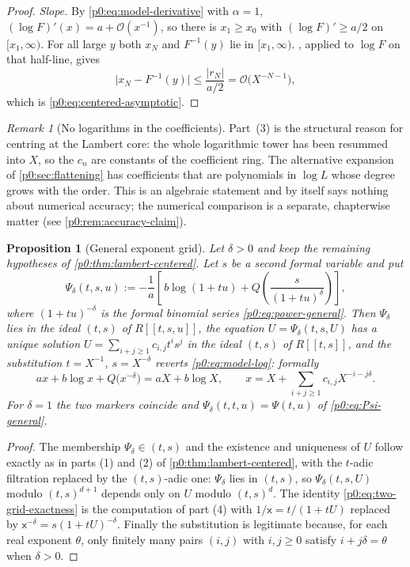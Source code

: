 \documentclass[11pt,a4paper,oneside]{book}
\theoremstyle{plain}
\newtheorem{proposition}[theorem]{Proposition}
\theoremstyle{definition}
\theoremstyle{remark}
\newtheorem{remark}[theorem]{Remark}
\newcommand{\bigO}{\mathcal{O}}
\begin{document}
\begin{proof}
\emph{Slope.}  By \eqref{p0:eq:model-derivative} with $\alpha=1$,
$(\log F)'(x)=a+\bigO(x^{-1})$, so there is $x_1\ge x_0$ with
$(\log F)'\ge a/2$ on $[x_1,\infty)$.  For all large $y$ both $x_N$ and
$F^{-1}(y)$ lie in $[x_1,\infty)$.  , applied to
$\log F$ on that half-line, gives
\[
 \bigl|x_N-F^{-1}(y)\bigr|\le\frac{|r_N|}{a/2}
 =\bigO\bigl(X^{-N-1}\bigr),
\]
which is \eqref{p0:eq:centered-asymptotic}.
\end{proof}

\begin{remark}[No logarithms in the coefficients]\label{p0:rem:no-logs}
Part~(3) is the structural reason for centring at the Lambert core: the whole
logarithmic tower has been resummed into $X$, so the $c_n$ are constants of the
coefficient ring.  The alternative expansion of \cref{p0:sec:flattening} has
coefficients that are polynomials in $\log L$ whose degree grows with the
order.  This is an algebraic statement and by itself says nothing about
numerical accuracy; the numerical comparison is a separate, chapterwise matter
(see \cref{p0:rem:accuracy-claim}).
\end{remark}

\begin{proposition}[General exponent grid]\label{p0:prop:two-grid}
Let $\delta>0$ and keep the remaining hypotheses of
\cref{p0:thm:lambert-centered}.  Let $s$ be a second formal variable and put
\begin{equation}\label{p0:eq:Psi-two-grid}
 \Psi_\delta(t,s,u):=-\frac1a\left[\,b\log(1+tu)
   +Q\!\left(\frac{s}{(1+tu)^{\delta}}\right)\right],
\end{equation}
where $(1+tu)^{-\delta}$ is the formal binomial series
\eqref{p0:eq:power-general}.  Then $\Psi_\delta$ lies in the ideal $(t,s)$ of
$R[[t,s,u]]$, the equation $U=\Psi_\delta(t,s,U)$ has a unique solution
$U=\sum_{i+j\ge1}c_{i,j}t^is^j$ in the ideal $(t,s)$ of $R[[t,s]]$, and the
substitution $t=X^{-1}$, $s=X^{-\delta}$ reverts \eqref{p0:eq:model-log}:
formally
\begin{equation}\label{p0:eq:two-grid-exactness}
 ax+b\log x+Q\bigl(x^{-\delta}\bigr)=aX+b\log X,
 \qquad x=X+\sum_{i+j\ge1}c_{i,j}X^{-i-j\delta}.
\end{equation}
For $\delta=1$ the two markers coincide and
$\Psi_\delta(t,t,u)=\Psi(t,u)$ of \eqref{p0:eq:Psi-general}.
\end{proposition}

\begin{proof}
The membership $\Psi_\delta\in(t,s)$ and the existence and uniqueness of $U$
follow exactly as in parts (1) and (2) of \cref{p0:thm:lambert-centered}, with
the $t$-adic filtration replaced by the $(t,s)$-adic one: $\Psi_\delta$ lies in
$(t,s)$, so $\Psi_\delta(t,s,U)$ modulo $(t,s)^{d+1}$ depends only on $U$
modulo $(t,s)^{d}$.  The identity \eqref{p0:eq:two-grid-exactness} is the
computation of part (4) with $1/\mathsf x=t/(1+tU)$ replaced by
$\mathsf x^{-\delta}=s(1+tU)^{-\delta}$.  Finally the substitution is
legitimate because, for each real exponent $\theta$, only finitely many pairs
$(i,j)$ with $i,j\ge0$ satisfy $i+j\delta=\theta$ when $\delta>0$.
\end{proof}
\end{document}
